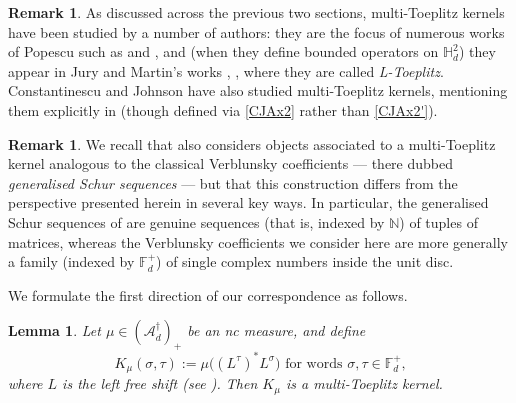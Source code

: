 \documentclass[11pt,reqno]{amsart}
\newcommand\ncm[1]{(\mathscr{A}_{#1}^{\dagger})_+}
\def\s{\sigma}
\def\t{\tau}
\def\NN{\mathbb{N}}
\def\FF{\mathbb{F}}
\def\HH{\mathbb{H}}
\newtheorem{lemma}[theorem]{Lemma}
\theoremstyle{definition}
\newtheorem{remark}[theorem]{Remark}
\numberwithin{equation}{section}
\begin{document}
\begin{remark}
   As discussed across the previous two sections, multi-Toeplitz kernels have been studied by a number of authors: they are the focus of numerous works of Popescu such as \cite{Pop01} and \cite{Pop06}, and (when they define bounded operators on \(\HH^2_d\)) they appear in Jury and Martin's works \cite{JM22a}, \cite{JM22b}, where they are called \emph{L-Toeplitz}. Constantinescu and Johnson have also studied multi-Toeplitz kernels, mentioning them explicitly in \cite{CJ02a} (though defined via \eqref{CJAx2} rather than \eqref{CJAx2'}). 
\end{remark}

\begin{remark}
    \label{rem:PopescuWeakSzego}
   We recall that \cite{Pop01} also considers objects associated to a multi-Toeplitz kernel analogous to the classical Verblunsky coefficients --- there dubbed \emph{generalised Schur sequences} --- but that this construction differs from the perspective presented herein in several key ways. In particular, the generalised Schur sequences of \cite{Pop01} are genuine sequences (that is, indexed by \(\NN\)) of tuples of matrices, whereas the Verblunsky coefficients we consider here are more generally a family (indexed by \(\FF_d^+\)) of single complex numbers inside the unit disc.
\end{remark}

We formulate the first direction of our correspondence as follows.

\begin{lemma}
    \label{lem:Correspondence1}
    Let \(\mu \in \ncm{d}\) be an nc measure, and define 
    \[
        K_{\mu}(\s,\t) := \mu\big((L^{\t})^*L^{\s}\big) \text{ for words \(\s, \t \in \FF_d^+\),}
    \]
    where \(L\) is the left free shift (see ).
    Then \(K_\mu\) is a multi-Toeplitz kernel.
\end{lemma}
\end{document}
